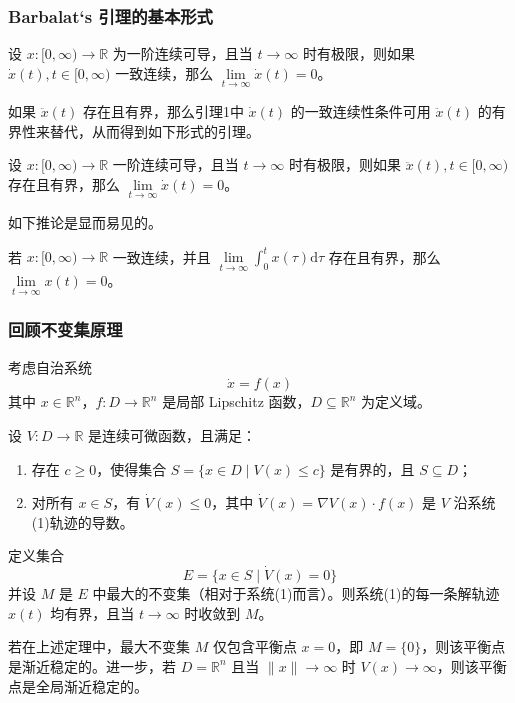 \begin{frame}
  \frametitle{Barbalat‘s 引理的基本形式}

  \begin{lemma}
  设 $x:[0, \infty) \to \mathbb{R}$ 为一阶连续可导，且当 $t \to \infty$ 时有极限，则如果 $\dot{x}(t), t \in [0, \infty)$ 一致连续，那么 $\lim\limits_{t \to \infty} \dot{x}(t) = 0$。
  \end{lemma} 

  如果 $\ddot{x}(t)$ 存在且有界，那么引理1中 $\dot{x}(t)$ 的一致连续性条件可用 $\ddot{x}(t)$ 的有界性来替代，从而得到如下形式的引理。

  \begin{lemma}
  设 $x:[0, \infty) \to \mathbb{R}$ 一阶连续可导，且当 $t \to \infty$ 时有极限，则如果 $\ddot{x}(t), t \in [0, \infty)$ 存在且有界，那么 $\lim\limits_{t \to \infty} \dot{x}(t) = 0$。
  \end{lemma}

  如下推论是显而易见的。

  \begin{corollary}
    若 $x: [0, \infty) \to \mathbb{R}$ 一致连续，并且 $\lim\limits_{t \to \infty} \int_{0}^{t} x(\tau) \mathrm{d}\tau$ 存在且有界，那么 $\lim\limits_{t \to \infty} x(t) = 0$。
  \end{corollary}
\end{frame}

\begin{frame}
  \frametitle{回顾不变集原理}
  考虑自治系统
\[
\dot{x} = f(x) \tag{1}
\]
其中 $x \in \mathbb{R}^n$，$f: D \to \mathbb{R}^n$ 是局部 Lipschitz 函数，$D \subseteq \mathbb{R}^n$ 为定义域。

  设 $V: D \to \mathbb{R}$ 是连续可微函数，且满足：
  \begin{enumerate}
      \item 存在 $c \geq 0$，使得集合 $S = \{x \in D \mid V(x) \leq c\}$ 是有界的，且 $S \subseteq D$；
      \item 对所有 $x \in S$，有 $\dot{V}(x) \leq 0$，其中 $\dot{V}(x) = \nabla V(x) \cdot f(x)$ 是 $V$ 沿系统(1)轨迹的导数。
  \end{enumerate}

  定义集合
  \[
  E = \{x \in S \mid \dot{V}(x) = 0\}
  \]
  并设 $M$ 是 $E$ 中最大的不变集（相对于系统(1)而言）。则系统(1)的每一条解轨迹 $x(t)$ 均有界，且当 $t \to \infty$ 时收敛到 $M$。


  若在上述定理中，最大不变集 $M$ 仅包含平衡点 $x = 0$，即 $M = \{0\}$，则该平衡点是渐近稳定的。进一步，若 $D = \mathbb{R}^n$ 且当 $\|x\| \to \infty$ 时 $V(x) \to \infty$，则该平衡点是全局渐近稳定的。
\end{frame}


